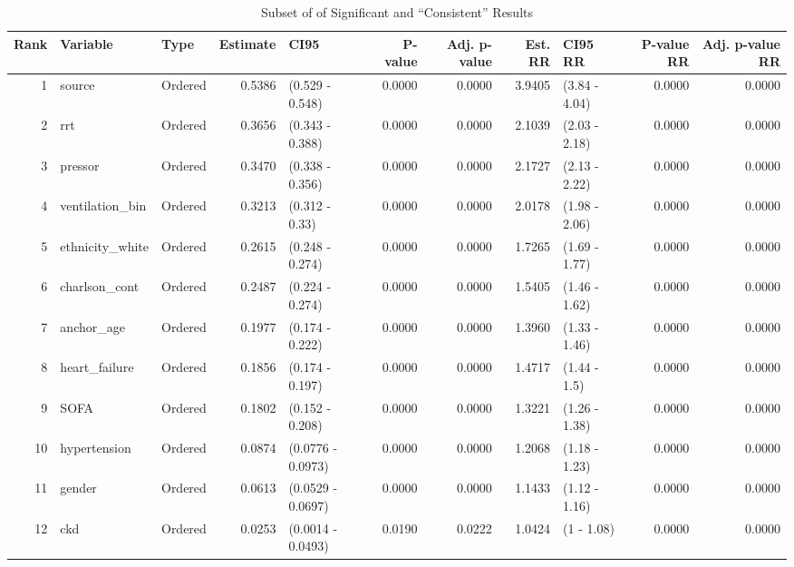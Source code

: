 \begin{table}[ht]
\centering
\caption{Subset of of Significant and ``Consistent'' Results} 
\label{consisRes}
\begin{tabular}{rllrlrrrlrr}
  \hline
Rank & Variable & Type & Estimate & CI95 & P-value & Adj. p-value & Est. RR & CI95 RR & P-value RR & Adj. p-value RR \\ 
  \hline
    1 & source & Ordered & 0.5386 & (0.529 - 0.548) & 0.0000 & 0.0000 & 3.9405 & (3.84 - 4.04) & 0.0000 & 0.0000 \\ 
      2 & rrt & Ordered & 0.3656 & (0.343 - 0.388) & 0.0000 & 0.0000 & 2.1039 & (2.03 - 2.18) & 0.0000 & 0.0000 \\ 
      3 & pressor & Ordered & 0.3470 & (0.338 - 0.356) & 0.0000 & 0.0000 & 2.1727 & (2.13 - 2.22) & 0.0000 & 0.0000 \\ 
      4 & ventilation\_bin & Ordered & 0.3213 & (0.312 - 0.33) & 0.0000 & 0.0000 & 2.0178 & (1.98 - 2.06) & 0.0000 & 0.0000 \\ 
      5 & ethnicity\_white & Ordered & 0.2615 & (0.248 - 0.274) & 0.0000 & 0.0000 & 1.7265 & (1.69 - 1.77) & 0.0000 & 0.0000 \\ 
      6 & charlson\_cont & Ordered & 0.2487 & (0.224 - 0.274) & 0.0000 & 0.0000 & 1.5405 & (1.46 - 1.62) & 0.0000 & 0.0000 \\ 
      7 & anchor\_age & Ordered & 0.1977 & (0.174 - 0.222) & 0.0000 & 0.0000 & 1.3960 & (1.33 - 1.46) & 0.0000 & 0.0000 \\ 
      8 & heart\_failure & Ordered & 0.1856 & (0.174 - 0.197) & 0.0000 & 0.0000 & 1.4717 & (1.44 - 1.5) & 0.0000 & 0.0000 \\ 
      9 & SOFA & Ordered & 0.1802 & (0.152 - 0.208) & 0.0000 & 0.0000 & 1.3221 & (1.26 - 1.38) & 0.0000 & 0.0000 \\ 
     10 & hypertension & Ordered & 0.0874 & (0.0776 - 0.0973) & 0.0000 & 0.0000 & 1.2068 & (1.18 - 1.23) & 0.0000 & 0.0000 \\ 
     11 & gender & Ordered & 0.0613 & (0.0529 - 0.0697) & 0.0000 & 0.0000 & 1.1433 & (1.12 - 1.16) & 0.0000 & 0.0000 \\ 
     12 & ckd & Ordered & 0.0253 & (0.0014 - 0.0493) & 0.0190 & 0.0222 & 1.0424 & (1 - 1.08) & 0.0000 & 0.0000 \\ 
   \hline
\end{tabular}
\end{table}
